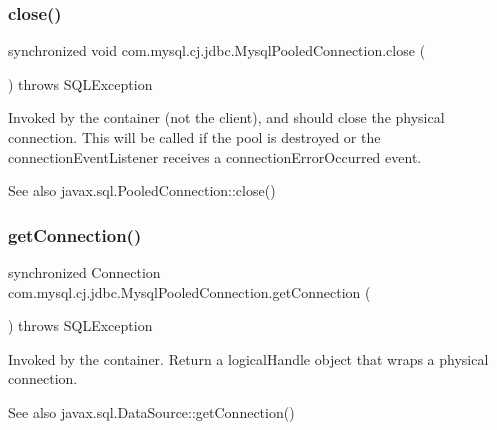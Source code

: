 \subsubsection{\texorpdfstring{close()}{close()}}
{\footnotesize\ttfamily synchronized void com.\+mysql.\+cj.\+jdbc.\+Mysql\+Pooled\+Connection.\+close (\begin{DoxyParamCaption}{ }\end{DoxyParamCaption}) throws S\+Q\+L\+Exception}

Invoked by the container (not the client), and should close the physical connection. This will be called if the pool is destroyed or the connection\+Event\+Listener receives a connection\+Error\+Occurred event.

\begin{DoxySeeAlso}{See also}
javax.\+sql.\+Pooled\+Connection\+::close() 
\end{DoxySeeAlso}
\mbox{\label{classcom_1_1mysql_1_1cj_1_1jdbc_1_1_mysql_pooled_connection_a0aa675b4e16ec148099680b9651d90e7}} 
\subsubsection{\texorpdfstring{get\+Connection()}{getConnection()}\hspace{0.1cm}{\footnotesize\ttfamily [1/2]}}
{\footnotesize\ttfamily synchronized Connection com.\+mysql.\+cj.\+jdbc.\+Mysql\+Pooled\+Connection.\+get\+Connection (\begin{DoxyParamCaption}{ }\end{DoxyParamCaption}) throws S\+Q\+L\+Exception}

Invoked by the container. Return a logical\+Handle object that wraps a physical connection.

\begin{DoxySeeAlso}{See also}
javax.\+sql.\+Data\+Source\+::get\+Connection() 
\end{DoxySeeAlso}
\mbox{\label{classcom_1_1mysql_1_1cj_1_1jdbc_1_1_mysql_pooled_connection_af11a94c2e295f24a352a705b8cec6318}} 
